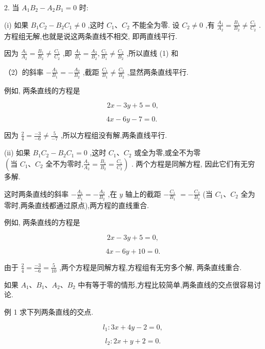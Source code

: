 \documentclass[lang=cn,newtx,10pt,scheme=chinese]{elegantbook}
\begin{document}
2. 当 \({A}_{1}{B}_{2} - {A}_{2}{B}_{1} = 0\) 时:

(i) 如果 \({B}_{1}{C}_{2} - {B}_{2}{C}_{1} \neq 0\) ,这时 \({C}_{1}\text{、}{C}_{2}\) 不能全为零. 设 \({C}_{2} \neq 0\) ,有 \(\frac{{A}_{1}}{{A}_{2}} = \frac{{B}_{1}}{{B}_{2}} \neq \frac{{C}_{1}}{{C}_{2}}\) . 方程组无解,也就是说这两条直线不相交, 即两直线平行.

因为 \(\frac{{A}_{1}}{{A}_{2}} = \frac{{B}_{1}}{{B}_{2}} \neq \frac{{C}_{1}}{{C}_{2}}\) ,即 \(\frac{{A}_{1}}{{B}_{1}} = \frac{{A}_{2}}{{B}_{2}},\frac{{C}_{1}}{{B}_{1}} \neq \frac{{C}_{2}}{{B}_{2}}\) ,所以直线 (1) 和

（2）的斜率 \(- \frac{{A}_{1}}{{B}_{1}} = - \frac{{A}_{2}}{{B}_{2}}\) ,截距 \(\frac{{C}_{1}}{{B}_{1}} \neq \frac{{C}_{2}}{{B}_{2}}\) ,显然两条直线平行.

例如, 两条直线的方程是

\[
    {2x} - {3y} + 5 = 0,
\]

\[
    {4x} - {6y} - 7 = 0\text{. }
\]

因为 \(\frac{2}{4} = \frac{-3}{-6} \neq \frac{5}{-7}\) ,所以方程组没有解,两条直线平行.

(ii) 如果 \({B}_{1}{C}_{2} - {B}_{2}{C}_{1} = 0\) ,这时 \({C}_{1}\text{、}{C}_{2}\) 或全为零,或全不为零 \(\left( {\text{当 }{C}_{1}\text{、}{C}_{2}\text{ 全不为零时,}\frac{{A}_{1}}{{A}_{2}} = \frac{{B}_{1}}{{B}_{2}} = \frac{{C}_{1}}{{C}_{2}}}\right)\) . 两个方程是同解方程, 因此它们有无穷多解.

这时两条直线的斜率 \(- \frac{{A}_{1}}{{B}_{1}} = - \frac{{A}_{2}}{{B}_{2}}\) ,在 \(y\) 轴上的截距 \(- \frac{{C}_{1}}{{B}_{1}}\) \(= - \frac{{C}_{2}}{{B}_{2}}\) (当 \({C}_{1}\text{、}{C}_{2}\) 全为零时,两条直线都通过原点),两方程的直线重合.

例如, 两条直线的方程是

\[
    {2x} - {3y} + 5 = 0,
\]

\[
    {4x} - {6y} + {10} = 0.
\]

由于 \(\frac{2}{4} = \frac{-3}{-6} = \frac{5}{10}\) ,两个方程是同解方程,方程组有无穷多个解, 两条直线重合.

如果 \({A}_{1}\text{、}{B}_{1}\text{、}{A}_{2}\text{、}{B}_{2}\) 中有等于零的情形,方程比较简单,两条直线的交点很容易讨论.

例 1 求下列两条直线的交点.

\[
    {l}_{1} : {3x} + {4y} - 2 = 0,
\]

\[
    {l}_{2} : {2x} + y + 2 = 0.
\]
\end{document}
